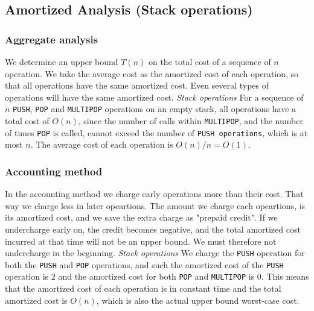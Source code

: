 \subsection*{Amortized Analysis (Stack operations)}
\subsubsection*{Aggregate analysis}
We determine an upper bound $T(n)$ on the total cost of a sequence of $n$
operation. We take the average cost as the amortized cost of each operation, so
that all operations have the same amortized cost. Even several types of
operations will have the same amortized cost.
\newline\newline\textit{Stack operations}\newline
For a sequence of $n$ \texttt{PUSH}, \texttt{POP} and \texttt{MULTIPOP}
operations on an empty stack, all operations have a total cost of $O(n)$, since
the number of calls within \texttt{MULTIPOP}, and the number of times
\texttt{POP} is called, cannot exceed the number of \texttt{PUSH operations},
which is at most $n$. The average cost of each operation is $O(n)/n=O(1)$.

\subsubsection*{Accounting method}
In the accounting method we charge early operations more than their cost. That
way we charge less in later opeartions. The amount we charge each opeartions, is
its amortized cost, and we save the extra charge as "prepaid credit". If we
undercharge early on, the credit becomes negative, and the total amortized cost
incurred at that time will not be an upper bound. We must therefore not
undercharge in the beginning.
\newline\newline\textit{Stack operations}\newline
We charge the \texttt{PUSH} operation for both the \texttt{PUSH} and
\texttt{POP} operations, and such the amortized cost of the \texttt{PUSH}
operation is $2$ and the amortized cost for both \texttt{POP} and
\texttt{MULTIPOP} is $0$. This means that the amortized cost of each operation
is in constant time and the total amortized cost is $O(n)$, which is also the
actual upper bound worst-case cost.

